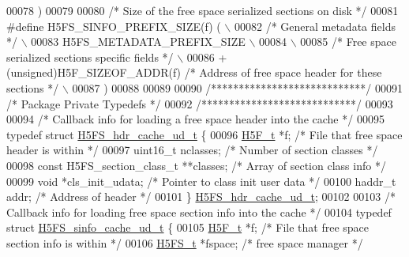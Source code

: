 \begin{DoxyCode}
00078 \textcolor{preprocessor}{    )}
00079 
00080 \textcolor{comment}{/* Size of the free space serialized sections on disk */}
00081 \textcolor{preprocessor}{#define H5FS\_SINFO\_PREFIX\_SIZE(f) (                                           \(\backslash\)}
00082 \textcolor{preprocessor}{    }\textcolor{comment}{/* General metadata fields */}\textcolor{preprocessor}{                                             \(\backslash\)}
00083 \textcolor{preprocessor}{    H5FS\_METADATA\_PREFIX\_SIZE                                                 \(\backslash\)}
00084 \textcolor{preprocessor}{                                                                              \(\backslash\)}
00085 \textcolor{preprocessor}{    }\textcolor{comment}{/* Free space serialized sections specific fields */}\textcolor{preprocessor}{                      \(\backslash\)}
00086 \textcolor{preprocessor}{    + (unsigned)H5F\_SIZEOF\_ADDR(f) }\textcolor{comment}{/* Address of free space header for these sections */}\textcolor{preprocessor}{ \(\backslash\)}
00087 \textcolor{preprocessor}{    )}
00088 
00089 
00090 \textcolor{comment}{/****************************/}
00091 \textcolor{comment}{/* Package Private Typedefs */}
00092 \textcolor{comment}{/****************************/}
00093 
00094 \textcolor{comment}{/* Callback info for loading a free space header into the cache */}
00095 \textcolor{keyword}{typedef} \textcolor{keyword}{struct }\hyperlink{struct_h5_f_s__hdr__cache__ud__t}{H5FS\_hdr\_cache\_ud\_t} \{
00096     \hyperlink{struct_h5_f__t}{H5F\_t} *f;                  \textcolor{comment}{/* File that free space header is within */}
00097     uint16\_t nclasses;                            \textcolor{comment}{/* Number of section classes */}
00098     \textcolor{keyword}{const} H5FS\_section\_class\_t **classes;       \textcolor{comment}{/* Array of section class info */}
00099     \textcolor{keywordtype}{void} *cls\_init\_udata;                       \textcolor{comment}{/* Pointer to class init user data */}
00100     haddr\_t addr;              \textcolor{comment}{/* Address of header */}
00101 \} \hyperlink{struct_h5_f_s__hdr__cache__ud__t}{H5FS\_hdr\_cache\_ud\_t};
00102 
00103 \textcolor{comment}{/* Callback info for loading free space section info into the cache */}
00104 \textcolor{keyword}{typedef} \textcolor{keyword}{struct }\hyperlink{struct_h5_f_s__sinfo__cache__ud__t}{H5FS\_sinfo\_cache\_ud\_t} \{
00105     \hyperlink{struct_h5_f__t}{H5F\_t} *f;                  \textcolor{comment}{/* File that free space section info is within */}
00106     \hyperlink{struct_h5_f_s__t}{H5FS\_t} *fspace;            \textcolor{comment}{/* free space manager */}

\end{DoxyCode}

